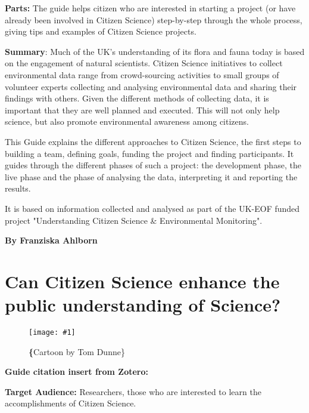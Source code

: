 \documentclass{article}
\newlength{\imgwidth}
\newcommand\scaledgraphics[2]{%
                
\settowidth{\imgwidth}{\texttt{[image: \#1]}}%
                
\setlength{\imgwidth}{\minof{\imgwidth}{#2\textwidth}}%
                
\texttt{[image: \#1]}%
                
}
\begin{document}
\textbf{Parts: }The guide helps citizen who are interested in starting a project (or have already been involved in Citizen Science) step-by-step through the whole process, giving tips and examples of Citizen Science projects.


\textbf{Summary}: Much of the UK's understanding of its flora and fauna today is based on the engagement of natural scientists. Citizen Science initiatives to collect environmental data range from crowd-sourcing activities to small groups of volunteer experts collecting and analysing environmental data and sharing their findings with others. Given the different methods of collecting data, it is important that they are well planned and executed. This will not only help science, but also promote environmental awareness among citizens.


This Guide explains the different approaches to Citizen Science, the first steps to building a team, defining goals, funding the project and finding participants. It guides through the different phases of such a project: the development phase, the live phase and the phase of analysing the data, interpreting it and reporting the results.


It is based on information collected and analysed as part of the UK-EOF funded project "Understanding Citizen Science \& Environmental Monitoring".


\textbf{By Franziska Ahlborn}


\section{Can Citizen Science enhance the public understanding of Science?}\label{H2333653}



\begin{center}
\begin{figure}
\scaledgraphics{fb9872a4-8371-4bfe-a930-f1d621c5649e.png}{0.5}
\caption*{\textbf\{Cartoon by Tom Dunne\}}\label{F26530171}
\end{figure}


\end{center}





\textbf{Guide citation insert from Zotero:} \autocite{bonney_can_2015}


\textbf{Target Audience: }Researchers, those who are interested to learn the accomplishments of Citizen Science.
\end{document}
